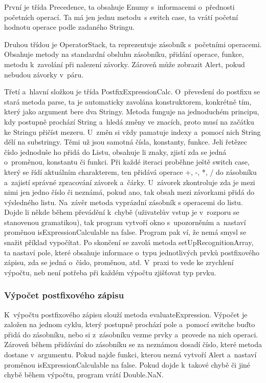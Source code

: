 \documentclass[a4paper,oneside,12p]{report}
\begin{document}
První je třída Precedence, ta obsahuje Enumy s~informacemi o~přednosti početních operací.
Ta má jen jednu metodu~s switch case, ta vrátí početní hodnotu operace podle zadaného Stringu.

Druhou třídou je OperatorStack, ta reprezentuje zásobník s~početními operacemi.
Obsahuje metody na standardní obsluhu zásobníku, přidání operace, funkce, metodu k~zavolání při nalezení závorky.
Zároveň může zobrazit Alert, pokud nebudou závorky v~páru.

Třetí a~hlavní složkou je třída PostfixExpressionCalc.
O~převedení do postfixu se stará metoda parse, ta je automaticky zavolána konstruktorem, konkrétně tím, který jako argument bere dva Stringy.
Metoda funguje na jednoduchém principu, kdy postupně prochází String a~hledá změny ve znacích, proto musí na začátku ke Stringu přičíst mezeru.
U~změn si vždy pamatuje indexy a~pomocí nich String dělí na substringy.
Těmi už jsou samotná čísla, konstanty, funkce.
Jeli řetězec číslo jednoduše ho přidá do Listu, obsahuje li znaky, zjistí zda se jedná o~proměnou, konstantu či funkci.
Při každé iteraci proběhne ještě switch case, který se řídí aktuálním charakterem, ten přidává operace +, -, *, / do zásobníku a~zajistí správné zpracování závorek a~čárky.
U~závorek zkontroluje zda je mezi nimi jen jedno číslo či neznámá, pokud ano, tak obsah mezi závorkami přidá do výsledného listu.
Na~závěr metoda vyprázdní zásobník s operacemi do listu.
Dojde li někde během převádění k~chybě (uživatelův vstup je v~rozporu se stanovenou gramatikou), tak program vytvoří okno s~upozorněním a~nastaví proměnou isExpressionCalculable na false.
Program pak ví, že nemá smysl se snažit příklad vypočítat.
Po skončení se zavolá metoda setUpRecognitionArray, ta nastaví pole, které obsahuje informace o~typu jednotlivých prvků postfixového zápisu, zda se jedná o~číslo, proměnou, atd.
V~praxi to vede ke zrychlení výpočtu, neb není potřeba při každém výpočtu zjišťovat typ prvku.

\subsubsection{Výpočet postfixového zápisu}

K~výpočtu postfixového zápisu slouží metoda evaluateExpression.
Výpočet je založen na jednom cyklu, který postupně prochází pole a~pomocí switche buďto přidá do zásobníku, nebo si z~zásobníku vezme prvky a~provede na nich operaci.
Zároveň během přidávání do zásobníku se za neznámou dosadí číslo, které metoda dostane v~argumentu.
Pokud najde funkci, kterou nezná vytvoří Alert a~nastaví proměnou isExpressionCalculable na false.
Pokud dojde k~takové chybě či jiné chybě během výpočtu, program vrátí Double.NaN.
\end{document}
